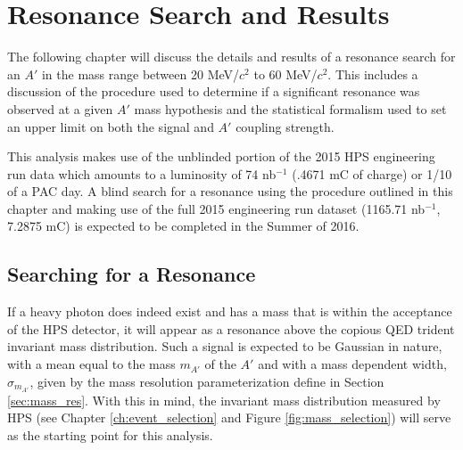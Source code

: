 
\chapter{Resonance Search and Results} \label{chap:resonance}

The following chapter will discuss the details and results of a resonance 
search for an $A'$ in the mass range between 20 MeV/$c^2$ to 60 MeV/$c^2$.
This includes a discussion of the procedure used to determine if a significant
resonance was observed at a given $A'$ mass hypothesis and the statistical
formalism used to set an upper limit on both the signal and $A'$ coupling
strength.

This analysis makes use of
the unblinded portion of the 2015 HPS engineering run data which amounts to 
a luminosity of 74 nb$^{-1}$ (.4671 mC of charge) or 1/10 of a PAC day.  
A blind search for a resonance using the procedure outlined in this chapter 
and making use of the full 2015 engineering run 
dataset (1165.71 nb$^{-1}$, 7.2875 mC) is expected to be completed in the 
Summer of 2016.

\section{Searching for a Resonance}

If a heavy photon does indeed exist and has a mass that is within the acceptance
of the HPS detector, it will appear as a resonance above the copious QED trident
invariant mass distribution.  Such a signal is expected to be Gaussian in 
nature, with a mean equal to the mass $m_{A'}$ of the $A'$ and with a mass
dependent width, $\sigma_{m_{A'}}$, given by the mass resolution 
parameterization define in Section \ref{sec:mass_res}. With this in mind, the 
invariant mass distribution measured by HPS (see Chapter 
\ref{ch:event_selection} and Figure \ref{fig:mass_selection}) will serve as the
starting point for this analysis. 

